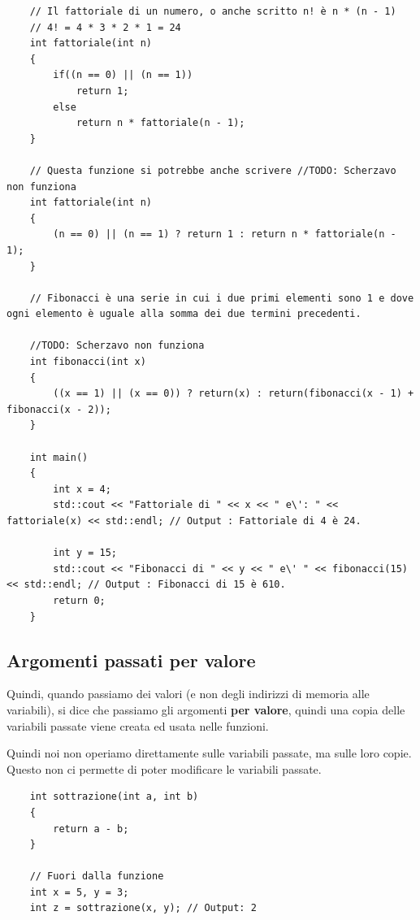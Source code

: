 \begin{lstlisting}
	// Il fattoriale di un numero, o anche scritto n! è n * (n - 1)
	// 4! = 4 * 3 * 2 * 1 = 24
	int fattoriale(int n)
	{
		if((n == 0) || (n == 1))
			return 1;
		else
			return n * fattoriale(n - 1);
	}

	// Questa funzione si potrebbe anche scrivere //TODO: Scherzavo non funziona
	int fattoriale(int n)
	{
		(n == 0) || (n == 1) ? return 1 : return n * fattoriale(n - 1);
	}

	// Fibonacci è una serie in cui i due primi elementi sono 1 e dove ogni elemento è uguale alla somma dei due termini precedenti. 
	
	//TODO: Scherzavo non funziona
	int fibonacci(int x)
	{
		((x == 1) || (x == 0)) ? return(x) : return(fibonacci(x - 1) + fibonacci(x - 2));
	}

	int main()
	{
		int x = 4;
		std::cout << "Fattoriale di " << x << " e\': " << fattoriale(x) << std::endl; // Output : Fattoriale di 4 è 24.
		
		int y = 15;
		std::cout << "Fibonacci di " << y << " e\' " << fibonacci(15) << std::endl; // Output : Fibonacci di 15 è 610.
		return 0;
	}
\end{lstlisting}



\subsection{Argomenti passati per valore}

\textsf{\small Quindi, quando passiamo dei valori (e non degli indirizzi di memoria alle variabili), si dice che passiamo gli argomenti \textbf{per valore}, quindi una copia delle variabili passate viene creata ed usata nelle funzioni. }

\textsf{\small Quindi noi non operiamo direttamente sulle variabili passate, ma sulle loro copie. Questo non ci permette di poter modificare le variabili passate.} \\

\begin{lstlisting}
	int sottrazione(int a, int b)
	{
		return a - b;
	}

	// Fuori dalla funzione
	int x = 5, y = 3;
	int z = sottrazione(x, y); // Output: 2
\end{lstlisting}


